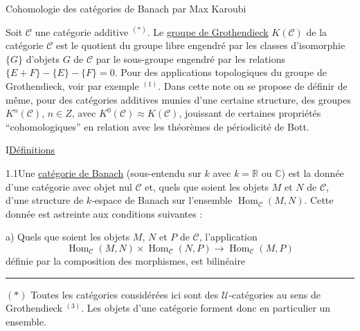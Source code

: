 \begin{center}
Cohomologie des catégories de Banach
par Max Karoubi
\end{center}

Soit $\mathcal C$ une catégorie additive $^{(*)}$. Le \uline{groupe de Grothendieck} $K(\mathcal C)$ de la catégorie $\mathcal C$ est le quotient du groupe libre engendré par les classes d'isomorphie $\{G\}$ d'objets $G$ de $\mathcal C$ par le sous-groupe engendré par les relations $\{E+F\}-\{E\}-\{F\}=0$. Pour des applications topologiques du groupe de Grothendieck, voir par exemple $^{(1)}$. Dans cette note on se propose de définir de même, pour des catégories additives munies d'une certaine structure, des groupes $K^n(\mathcal C)$, $n\in Z$, avec $K^0(\mathcal C)\approx K(\mathcal C)$, jouissant de certaines propriétés ``cohomologiques'' en relation avec les théorèmes de périodicité de Bott.

I\qquad \uline{Définitions}

1.1\quad Une \uline{catégorie de Banach} (sous-entendu sur $k$ avec $k=\mathbb R$ ou $\mathbb C$) est la donnée d'une catégorie avec objet nul $\mathcal C$ et, quels que soient les objets $M$ et $N$ de $\mathcal C$, d'une structure de $k$-espace de Banach sur l'ensemble $\operatorname{Hom}_{\mathcal C}(M,N)$. Cette donnée est astreinte aux conditions suivantes :

a) Quels que soient les objets $M$, $N$ et $P$ de $\mathcal C$, l'application
\[
\operatorname{Hom}_{\mathcal C}(M,N)\times\operatorname{Hom}_{\mathcal C}(N,P)\longrightarrow\operatorname{Hom}_{\mathcal C}(M,P)
\]
définie par la composition des morphismes, est bilinéaire

\noindent\rule{\linewidth}{.4pt}

$(*)$ Toutes les catégories considérées ici sont des $\mathcal U$-catégories au sens de Grothendieck $^{(3)}$. Les objets d'une catégorie forment donc en particulier un ensemble.
